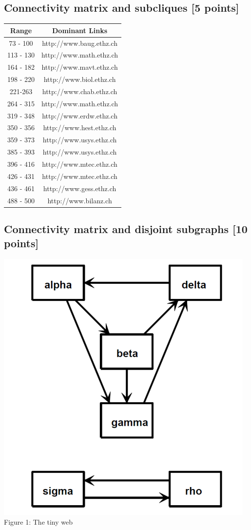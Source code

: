 \documentclass[unicode,11pt,a4paper,oneside,numbers=endperiod,openany]{scrartcl}
\begin{document}
\subsection{Connectivity matrix and subcliques [5 points]}
\begin{center}
 \begin{tabular}{|c | c|}
 \hline
 Range & Dominant Links \\ \hline
 73 - 100 & http://www.baug.ethz.ch \\ \hline
 113 - 130 & http://www.math.ethz.ch \\ \hline
 164 - 182 & http://www.mavt.ethz.ch \\ \hline
 198 - 220 & http://www.biol.ethz.ch \\ \hline
 221-263 & http://www.chab.ethz.ch \\ \hline
 264 - 315 & http://www.math.ethz.ch \\ \hline
 319 - 348 & http://www.erdw.ethz.ch \\ \hline
 350 - 356 & http://www.hest.ethz.ch \\ \hline
 359 - 373 & http://www.usys.ethz.ch \\ \hline
 385 - 393 & http://www.usys.ethz.ch \\ \hline
 396 - 416 & http://www.mtec.ethz.ch \\ \hline
 426 - 431 & http://www.mtec.ethz.ch \\ \hline
 436 - 461 & http://www.gess.ethz.ch \\ \hline
 488 - 500 & http://www.bilanz.ch \\ \hline
 \end{tabular}

\end{center}
\subsection{Connectivity matrix and disjoint subgraphs [10 points]}

\begin{center}
  \includegraphics[width=0.5\linewidth]{./images/figure7.png}\\
  \label{fig:Another tiny Web}
  {Figure 1: The tiny web}
\end{center}
\end{document}
